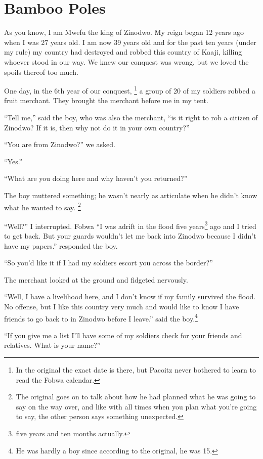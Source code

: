 \chapter{Bamboo Poles}

As you know, I am Mwefu the king of Zinodwo. My reign began 12 years ago when I was 27 years old. I am now 39 years old and for the past ten years (under my rule) my country had destroyed and robbed this country of Kaaji, killing whoever stood in our way.
We knew our conquest was wrong, but we loved the spoils thereof too much.

One day, in the 6th year of our conquest,
\footnote{In the original the exact date is there, but Pacoitz never bothered to learn to read the Fobwa calendar.}
a group of 20 of my soldiers robbed a fruit merchant. They brought the merchant before me in my tent.

``Tell me,'' said the boy, who was also the merchant, ``is it right to rob a citizen of Zinodwo? If it is, then why not do it in your own country?''

``You are from Zinodwo?'' we asked.

``Yes.''

``What are you doing here and why haven't you returned?''

The boy muttered something; he wasn't nearly as articulate when he didn't know what he wanted to say. \footnote{The original goes on to talk about how he had planned what he was going to say on the way over, and like with all times when you plan what you're going to say, the other person says something unexpected.}

``Well?'' I interrupted.
Fobwa
``I was adrift in the flood five years\footnote{five years and ten months actually.} ago and I tried to get back. But your guards wouldn't let me back into Zinodwo because I didn't have my papers.'' responded the boy.

``So you'd like it if I had my soldiers escort you across the border?''

The merchant looked at the ground and fidgeted nervously.

``Well, I have a livelihood here, and I don't know if my family survived the flood. No offense, but I like this country very much and would like to know I have friends to go back to in Zinodwo before I leave.'' said the boy.\footnote{He was hardly a boy since according to the original, he was 15.}

``If you give me a list I'll have some of my soldiers check for your friends and relatives. What is your name?''

